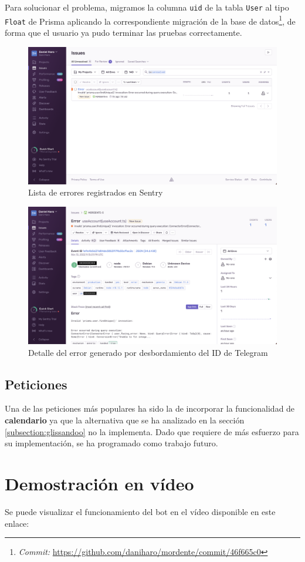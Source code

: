 Para solucionar el problema, migramos la columna \texttt{uid} de la tabla \texttt{User} al tipo \texttt{Float} de Prisma aplicando la correspondiente migración de la base de datos\footnote{\textit{Commit:} \url{https://github.com/daniharo/mordente/commit/46f665c0}}, de forma que el usuario ya pudo terminar las pruebas correctamente.

\begin{figure}[h]
\centering
\includegraphics[width=\textwidth]{imagenes/pruebas/sentry_error_uid.png}
\caption{Lista de errores registrados en Sentry}
\label{fig:sentryListaErrores}
\end{figure}

\begin{figure}[h]
\centering
\includegraphics[width=\textwidth]{imagenes/pruebas/sentry_detalle_error_uid.png}
\caption{Detalle del error generado por desbordamiento del ID de Telegram}
\label{fig:sentryDetalleError}
\end{figure}

\subsection{Peticiones}

Una de las peticiones más populares ha sido la de incorporar la funcionalidad de \textbf{calendario} ya que la alternativa que se ha analizado en la sección \ref{subsection:glissandoo} no la implementa. Dado que requiere de más esfuerzo para su implementación, se ha programado como trabajo futuro.


\section{Demostración en vídeo}

Se puede visualizar el funcionamiento del bot en el vídeo disponible en este enlace:
\url{}

